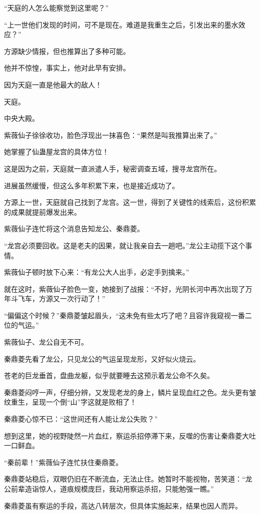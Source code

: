 \begin{this_body}
“天庭的人怎么能察觉到这里呢？”

“上一世他们发现的时间，可不是现在。难道是我重生之后，引发出来的墨水效应？”

方源缺少情报，但也推算出了多种可能。

他并不惊惶，事实上，他对此早有安排。

因为天庭一直是他最大的敌人！

天庭。

中央大殿。

紫薇仙子徐徐收功，脸色浮现出一抹喜色：“果然是叫我推算出来了。”

她掌握了仙蛊屋龙宫的具体方位！

这是因为之前，天庭就一直派遣人手，秘密调查五域，搜寻龙宫所在。

进展虽然缓慢，但这么多年积累下来，也是接近成功了。

方源上一世，天庭就自己找到了龙宫。这一世，得到了关键性的线索后，这份积累的成果就提前爆发出来。

紫薇仙子连忙将这个消息告知龙公、秦鼎菱。

“龙宫必须要回收。这是老夫的因果，就让我亲自去一趟吧。”龙公主动揽下这个事情。

紫薇仙子顿时放下心来：“有龙公大人出手，必定手到擒来。”

就在这时，紫薇仙子脸色一变，她接到了战报：“不好，光阴长河中再次出现了万年斗飞车，方源又一次行动了！”

“偏偏这个时候？”秦鼎菱皱起眉头，“这未免有些太巧了吧？且容许我窥视一番二位的气运。”

紫薇仙子、龙公自无不可。

秦鼎菱先看了龙公，只见龙公的气运呈现龙形，又好似火烧云。

苍老的巨龙垂首，盘曲龙躯，似乎就要睡去这预示着龙公命不久矣。

秦鼎菱闷哼一声，仔细分辨，又发现老龙的身上，鳞片呈现血红之色。龙头更有皱纹重生，呈现一个倒“山”字这就是败相了！

秦鼎菱心惊不已：“这世间还有人能让龙公失败？”

想到这里，她的视野陡然一片血红，察运杀招停滞下来，反噬的伤害让秦鼎菱大吐一口鲜血。

“秦前辈！”紫薇仙子连忙扶住秦鼎菱。

秦鼎菱站稳后，双眼仍旧在不断流血，无法止住。她暂时不能视物，苦笑道：“龙公前辈造诣惊人，道痕规模庞巨，我动用察运杀招，只能勉强一瞧。”

秦鼎菱虽有察运的手段，高达八转层次，但具体实施起来，结果也因人而异。


\end{this_body}
